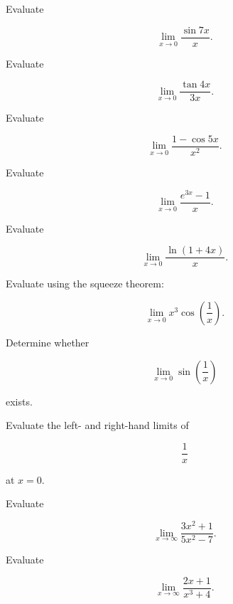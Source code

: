 \begin{exercise}[2]
Evaluate

\[
\lim_{x\to0}
\frac{\sin7x}{x}.
\]
\end{exercise}

\begin{exercise}[2]
Evaluate

\[
\lim_{x\to0}
\frac{\tan4x}{3x}.
\]
\end{exercise}

\begin{exercise}[2]
Evaluate

\[
\lim_{x\to0}
\frac{1-\cos5x}{x^2}.
\]
\end{exercise}

\begin{exercise}[2]
Evaluate

\[
\lim_{x\to0}
\frac{e^{3x}-1}{x}.
\]
\end{exercise}

\begin{exercise}[2]
Evaluate

\[
\lim_{x\to0}
\frac{\ln(1+4x)}{x}.
\]
\end{exercise}

\begin{exercise}[2]
Evaluate using the squeeze theorem:

\[
\lim_{x\to0}
x^3\cos\left(\frac1x\right).
\]
\end{exercise}

\begin{exercise}[2]
Determine whether

\[
\lim_{x\to0}
\sin\left(\frac1x\right)
\]

exists.
\end{exercise}

\begin{exercise}[2]
Evaluate the left- and right-hand limits of

\[
\frac1x
\]

at \(x=0\).
\end{exercise}

\begin{exercise}[2]
Evaluate

\[
\lim_{x\to\infty}
\frac{3x^2+1}{5x^2-7}.
\]
\end{exercise}

\begin{exercise}[2]
Evaluate

\[
\lim_{x\to\infty}
\frac{2x+1}{x^3+4}.
\]
\end{exercise}

